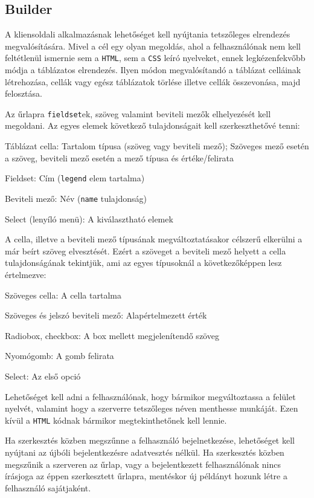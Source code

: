 \documentclass[12pt,a4paper,twoside]{article}
\newcommand{\desc}{
  \begin{description}{}{}
    \setlength\itemsep{0pt}
    \setlength\parskip{0pt}
    \setlength\topsep{0pt}
    \setlength\partopsep{0pt}
    \small}
\newcommand{\ed}{
  \end{description}
}
\begin{document}
\subsection{Builder}
\label{sec:spec}

A kliensoldali alkalmazásnak lehetőséget kell nyújtania tetszőleges elrendezés
megvalósítására. Mivel a cél egy olyan megoldás, ahol a felhasználónak nem kell
feltétlenül ismernie sem a \texttt{HTML}, sem a \texttt{CSS} leíró nyelveket,
ennek legkézenfekvőbb módja a táblázatos elrendezés. Ilyen módon megvalósítandó
a táblázat celláinak létrehozása, cellák vagy egész táblázatok törlése illetve
cellák összevonása, majd felosztása.

Az űrlapra \texttt{fieldset}ek, szöveg valamint beviteli mezők elhelyezését
kell megoldani. Az egyes elemek következő tulajdonságait kell szerkeszthetővé
tenni:

\clearpage
\desc
  \item[Táblázat cella:] Tartalom típusa (szöveg vagy beviteli mező); Szöveges
    mező esetén a szöveg, beviteli mező esetén a mező típusa és értéke/felirata
  \item[Fieldset:] Cím (\texttt{legend} elem tartalma)
  \item[Beviteli mező:] Név (\texttt{name} tulajdonság)
  \item[Select (lenyíló menü):] A kiválasztható elemek
\ed

A cella, illetve a beviteli mező típusának megváltoztatásakor célszerű elkerülni
a már beírt szöveg elvesztését. Ezért a szöveget a beviteli mező helyett a cella
tulajdonságának tekintjük, ami az egyes típusoknál a következőképpen lesz
értelmezve:

\desc
  \item[Szöveges cella:] A cella tartalma
  \item[Szöveges és jelszó beviteli mező:] Alapértelmezett érték
  \item[Radiobox, checkbox:] A box mellett megjelenítendő szöveg
  \item[Nyomógomb:] A gomb felirata
  \item[Select:] Az első opció
\ed

Lehetőséget kell adni a felhasználónak, hogy bármikor megváltoztassa a
felület nyelvét, valamint hogy a szerverre tetszőleges néven menthesse
munkáját. Ezen kívül a \texttt{HTML} kódnak bármikor megtekinthetőnek kell
lennie.

Ha szerkesztés közben megszűnne a felhasználó bejelnetkezése, lehetőséget kell
nyújtani az újbóli bejelentkezésre adatvesztés nélkül. Ha szerkesztés közben
megszűnik a szerveren az űrlap, vagy a bejelentkezett felhasználónak nincs
írásjoga az éppen szerkesztett űrlapra, mentéskor új példányt hozunk létre a
felhasználó sajátjaként.
\end{document}
